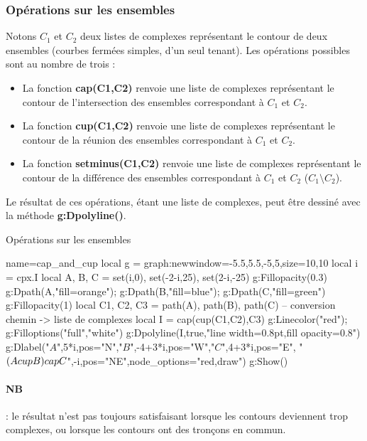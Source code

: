 \subsubsection{Opérations sur les ensembles}

Notons $C_1$ et $C_2$ deux listes de complexes représentant le contour de deux ensembles (courbes fermées simples, d'un seul tenant).
Les opérations possibles sont au nombre de trois :
\begin{itemize}
    \item La fonction \textbf{cap(C1,C2)} renvoie une liste de complexes représentant le contour de l'intersection des ensembles correspondant à $C_1$ et $C_2$.
    \item La fonction \textbf{cup(C1,C2)} renvoie une liste de complexes représentant le contour de la réunion des ensembles correspondant à $C_1$ et $C_2$.
        \item La fonction \textbf{setminus(C1,C2)} renvoie une liste de complexes représentant le contour de la différence des ensembles correspondant à $C_1$ et $C_2$ ($C_1\setminus C_2$).    
\end{itemize}
Le résultat de ces opérations, étant une liste de complexes, peut être dessiné avec la méthode \textbf{g:Dpolyline()}.

\begin{demo}{Opérations sur les ensembles}
\begin{luadraw}{name=cap_and_cup}
local g = graph:new{window={-5.5,5.5,-5,5},size={10,10}}
local i = cpx.I
local A, B, C = set(i,0), set(-2-i,25), set(2-i,-25)
g:Fillopacity(0.3)
g:Dpath(A,"fill=orange"); g:Dpath(B,"fill=blue"); g:Dpath(C,"fill=green")
g:Fillopacity(1)
local C1, C2, C3 = path(A), path(B), path(C) -- conversion chemin -> liste de complexes
local I = cap(cup(C1,C2),C3)
g:Linecolor("red"); g:Filloptions("full","white")
g:Dpolyline(I,true,"line width=0.8pt,fill opacity=0.8")
g:Dlabel("$A$",5*i,{pos="N"},"$B$",-4+3*i,{pos="W"},"$C$",4+3*i,{pos="E"},
"$(A\\cup B) \\cap C$",-i,{pos="NE",node_options="red,draw"})
g:Show()
\end{luadraw}
\end{demo}

\paragraph{NB} : le résultat n'est pas toujours satisfaisant lorsque les contours deviennent trop complexes, ou lorsque les contours ont des tronçons en commun.

